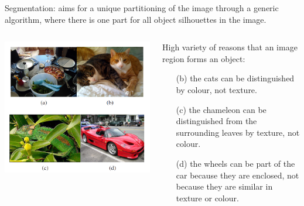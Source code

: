 \begin{frame}[allowframebreaks]
\medskip

	
\framebreak

Segmentation: aims for
a unique partitioning of the image through a generic algorithm,
where there is one part for all object silhouettes in the image.

\medskip 

\begin{columns} %
	
	\begin{column}{.5\textwidth}
		\begin{center}
			\includegraphics[scale=0.6]{figs/selectivesearch_pictures}
		\end{center}
	\end{column}%
	
	
	
	\begin{column}{.4\textwidth}
		High variety of reasons that an image region forms an object: 
		
		\begin{itemize}
			\item[(b)] the cats can be distinguished by colour, not
			texture. 
			
			\item[(c)] the chameleon can be distinguished from the surrounding
			leaves by texture, not colour.
			
			\item[(d)]  the wheels can be part
			of the car because they are enclosed, not because they are similar
			in texture or colour. 
			

\end{itemize}
\end{column}
\end{columns}
\end{frame}
